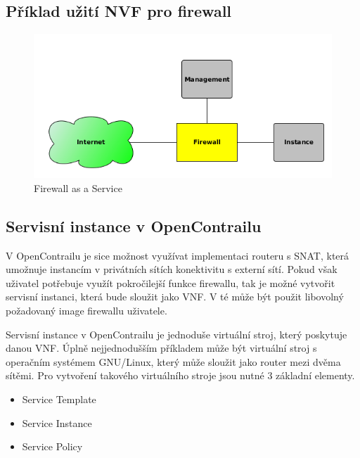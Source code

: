 \subsection{Příklad užití NVF pro firewall}


\begin{figure}[h]
\begin{centering}
\includegraphics[scale=0.6]{images/firewall}
\par\end{centering}
\caption{Firewall as a Service\label{fig:firewall}}
\end{figure}

\subsection{Servisní instance v OpenContrailu}

V OpenContrailu je sice možnost využívat implementaci routeru s SNAT, která umožnuje instancím v privátních sítích konektivitu s externí sítí. Pokud však uživatel potřebuje využít pokročilejší funkce firewallu, tak je možné vytvořit servisní instanci, která bude sloužit jako VNF. V té může být použit libovolný požadovaný image firewallu uživatele.

Servisní instance v OpenContrailu je jednoduše virtuální stroj, který poskytuje danou VNF. Úplně nejjednodušším příkladem může být virtuální stroj s operačním systémem GNU/Linux, který může sloužit jako router mezi dvěma sítěmi. Pro vytvoření takového virtuálního stroje jsou nutné 3 základní elementy. 

\begin{itemize}
 	\item Service Template
    \item Service Instance
    \item Service Policy
\end{itemize}


